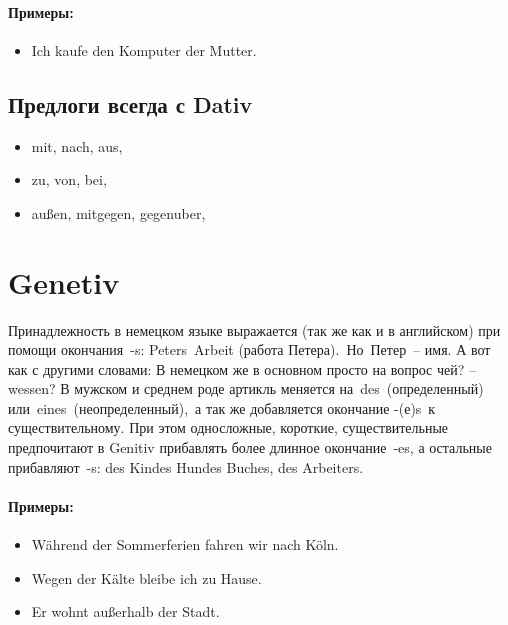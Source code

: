 \paragraph{Примеры:}

\begin{itemize}
\item Ich kaufe den Komputer der Mutter.
~\\ 
\end{itemize}

\subsection{Предлоги всегда с Dativ}

\begin{itemize}
\item mit, nach, aus,
\item zu, von, bei,
\item außen, mitgegen, gegenuber,
\end{itemize}

\section{Genetiv}

Принадлежность в немецком языке выражается (так же как и в английском) при помощи окончания -s: Peters Arbeit (работа Петера). Но Петер – имя. А вот как с другими словами: В немецком же в основном просто на вопрос чей? – wessen?
В мужском и среднем роде артикль меняется на des (определенный) или eines (неопределенный), а так же добавляется окончание -(е)s к существительному. При этом односложные, короткие, существительные предпочитают в Genitiv прибавлять более длинное окончание -es, а остальные прибавляют -s: des Kindes Hundes Buches, des Arbeiters.

\paragraph{Примеры:}

\begin{itemize}
\item Während der Sommerferien fahren wir nach Köln.
~\\ 
\item Wegen der Kälte bleibe ich zu Hause.
~\\ 
\item Er wohnt außerhalb der Stadt.
~\\ 
\end{itemize}

